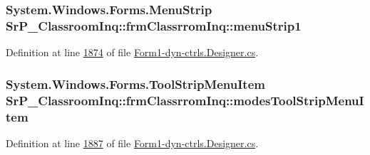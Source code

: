 \hypertarget{class_sr_p___classroom_inq_1_1frm_classrrom_inq_a549704b03b13cfbb5cbc07c18c0c600a}{
\subsubsection[{menu\-Strip1}]{\setlength{\rightskip}{0pt plus 5cm}\-System.\-Windows.\-Forms.\-Menu\-Strip {\bf \-Sr\-P\-\_\-\-Classroom\-Inq\-::frm\-Classrrom\-Inq\-::menu\-Strip1}}}
\label{class_sr_p___classroom_inq_1_1frm_classrrom_inq_a549704b03b13cfbb5cbc07c18c0c600a}


\-Definition at line \hyperlink{_form1-dyn-ctrls_8_designer_8cs_source_l01874}{1874} of file \hyperlink{_form1-dyn-ctrls_8_designer_8cs_source}{\-Form1-\/dyn-\/ctrls.\-Designer.\-cs}.

\hypertarget{class_sr_p___classroom_inq_1_1frm_classrrom_inq_a8eef2c0ef527338feb8e51e6ddef9cc1}{
\subsubsection[{modes\-Tool\-Strip\-Menu\-Item}]{\setlength{\rightskip}{0pt plus 5cm}\-System.\-Windows.\-Forms.\-Tool\-Strip\-Menu\-Item {\bf \-Sr\-P\-\_\-\-Classroom\-Inq\-::frm\-Classrrom\-Inq\-::modes\-Tool\-Strip\-Menu\-Item}}}
\label{class_sr_p___classroom_inq_1_1frm_classrrom_inq_a8eef2c0ef527338feb8e51e6ddef9cc1}


\-Definition at line \hyperlink{_form1-dyn-ctrls_8_designer_8cs_source_l01887}{1887} of file \hyperlink{_form1-dyn-ctrls_8_designer_8cs_source}{\-Form1-\/dyn-\/ctrls.\-Designer.\-cs}.

